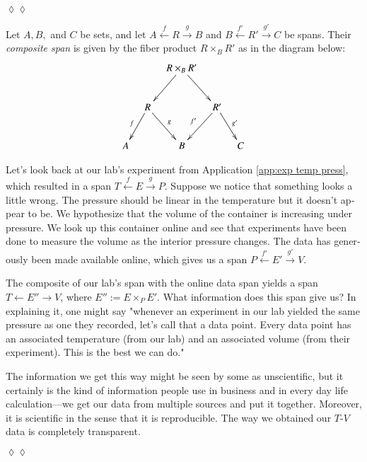 \documentclass{book}
\def\to{\rightarrow}
\def\from{\leftarrow}
\newcommand{\To}[1]{\xrightarrow{#1}}
\newcommand{\From}[1]{\xleftarrow{#1}}
\theoremstyle{theoremENG}
\theoremstyle{lemmaENG}
\theoremstyle{propositionENG}
\theoremstyle{corollaryENG}
\theoremstyle{factENG}
\theoremstyle{remarkENG}
\theoremstyle{exampleENG}
\theoremstyle{warningENG}
\theoremstyle{questionENG}
\theoremstyle{guessENG}
\theoremstyle{answerENG}
\theoremstyle{constructionENG}
\theoremstyle{rulesENG}
\theoremstyle{excENG}
\theoremstyle{appENG}
\newtheorem{appENG}[subsubsection]{\begin{english}Application\end{english}}
\theoremstyle{definitionENG}
\newtheorem{definitionENG}[subsubsection]{\begin{english}Definition\end{english}}
\theoremstyle{notationENG}
\theoremstyle{conjectureENG}
\theoremstyle{postulateENG}
\newenvironment{applicationENG}{\begin{appENG}}{\hspace*{\fill}$\lozenge\lozenge$\end{appENG}}
\theoremstyle{theoremRUS}
\theoremstyle{lemmaRUS}
\theoremstyle{propositionRUS}
\theoremstyle{corollaryRUS}
\theoremstyle{factRUS}
\theoremstyle{remarkRUS}
\theoremstyle{exampleRUS}
\theoremstyle{warningRUS}
\theoremstyle{questionRUS}
\theoremstyle{guessRUS}
\theoremstyle{answerRUS}
\theoremstyle{constructionRUS}
\theoremstyle{rulesRUS}
\theoremstyle{excRUS}
\theoremstyle{appRUS}
\theoremstyle{definitionRUS}
\theoremstyle{notationRUS}
\theoremstyle{conjectureRUS}
\theoremstyle{postulateRUS}
\begin{document}
\begin{english}
\begin{applicationENG}
\end{applicationENG}

\begin{definitionENG}\label{def:composite span}

Let $A,B,$ and $C$ be sets, and let $A\From{f}R\To{g}B$ and $B\From{f'}R'\To{g'}C$ be spans. Their {\em composite span} is given by the fiber product $R\times_BR'$ as in the diagram below:
$$
\xymatrix@=10pt{&&R\times_BR'\ar[ldd]\ar[rdd]\\\\&R\ar[ddl]_f\ar[ddr]^g&&R'\ar[ddl]_{f'}\ar[ddr]^{g'}\\\\A&&B&&C
}$$

\begin{russian} \end{russian}

\end{definitionENG}

\begin{applicationENG}\label{app:exp temp press 2}

Let's look back at our lab's experiment from Application \ref{app:exp temp press}, which resulted in a span $T\From{f}E\To{g}P$. Suppose we notice that something looks a little wrong. The pressure should be linear in the temperature but it doesn't appear to be. We hypothesize that the volume of the container is increasing under pressure. We look up this container online and see that experiments have been done to measure the volume as the interior pressure changes. The data has generously been made available online, which gives us a span $P\From{f'}E'\To{g'}V$. 

\begin{russian} \end{russian}

The composite of our lab's span with the online data span yields a span $T\from E''\to V$, where $E'':=E\times_PE'$. What information does this span give us? In explaining it, one might say "whenever an experiment in our lab yielded the same pressure as one they recorded, let's call that a data point. Every data point has an associated temperature (from our lab) and an associated volume (from their experiment). This is the best we can do." 

\begin{russian} \end{russian}

The information we get this way might be seen by some as unscientific, but it certainly is the kind of information people use in business and in every day life calculation---we get our data from multiple sources and put it together. Moreover, it is scientific in the sense that it is reproducible. The way we obtained our $T$-$V$ data is completely transparent.


\end{applicationENG}
\end{english}
\end{document}
